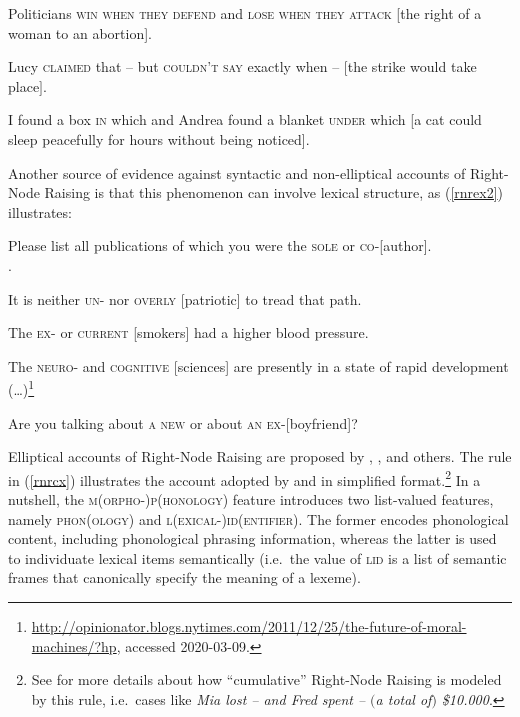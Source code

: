 \documentclass[output=paper
                ,modfonts
                ,nonflat
	        ,collection
	        ,collectionchapter
	        ,collectiontoclongg
 	        ,biblatex
                ,babelshorthands
                ,newtxmath
                ,draftmode
                ,colorlinks, citecolor=brown
]{./langsci/langscibook}
\begin{document}
{\begin{exe}
\begin{xlista}
 \ex Politicians \textsc{win when they defend} and \textsc{lose when they attack}
[the right of a woman to an abortion].

\ex Lucy \textsc{claimed} that -- but \textsc{couldn't say}
exactly when --  $[$the strike would take place$]$.
 
 \ex I found a box \textsc{in} which and Andrea found a blanket \textsc{under}
which [a cat could sleep peacefully for hours without being
noticed].
\end{xlista}\label{rnrex1}
\end{exe}

Another source of evidence against syntactic and non-elliptical accounts of Right-Node Raising is that this phenomenon can involve lexical structure,
as  (\ref{rnrex2}) illustrates:

\begin{exe}
\ex \begin{xlista}
\ex Please list all publications of which you were the \textsc{sole} or
\textsc{co}-[author].\\
 \citep[1325, footnote 44]{rodney}.
 
\ex  It is neither \textsc{un}- nor \textsc{overly} [patriotic] to tread that path.
 
\ex The \textsc{ex-} or \textsc{current} [smokers] had a higher blood pressure.\\
\citep[]{chaveslp} 

\ex The \textsc{neuro}- and \textsc{cognitive} [sciences] are
presently in a state of rapid development
(\ldots{})\footnote{\url{http://opinionator.blogs.nytimes.com/2011/12/25/the-future-of-moral-machines/?hp},
  accessed 2020-03-09.}

\ex Are you talking about \textsc{a new}  or about \textsc{an ex}-[boyfriend]?

\end{xlista}\label{rnrex2}
\end{exe}



Elliptical accounts of Right-Node Raising are proposed by \citet{Beavers},
\citet{Yatabe:04}, \citet{chavesrnr} and others. The rule in (\ref{rnrcx}) illustrates the account adopted by 
 \citet{chavesrnr}  and \citet[]{aoi}
  in simplified format.\footnote{See \citet{chavesrnr} for more details about how ``cumulative'' Right-Node Raising is modeled by this rule, i.e.\
 cases like \emph{Mia lost -- and Fred spent -- $($a total of$)$ \$10.000}.}
In a nutshell, the \textsc{m(orpho-)p(honology)} feature introduces two list-valued features, namely \textsc{phon}(\textsc{ology}) and \textsc{l(exical-)id(entifier)}. The former encodes phonological content, including phonological phrasing information,  whereas the latter is used to individuate lexical items semantically (i.e.\  the value
of \textsc{lid} is a list of semantic frames that canonically specify the meaning of a lexeme).

}
\end{document}
